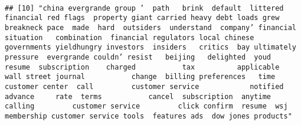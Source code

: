 \documentclass[
]{article}
\begin{document}
\begin{verbatim}
                                                                                                                                                                                                                                                                                                                                                                                                                                                                   
## [10] "china evergrande group ’  path   brink  default  littered  financial red flags  property giant carried heavy debt loads grew  breakneck pace  made  hard  outsiders  understand  company’ financial situation   combination  financial regulators local chinese governments yieldhungry investors  insiders   critics  bay ultimately   pressure  evergrande couldn’ resist   beijing   delighted  youd   resume  subscription    charged           tax          applicable   wall street journal           change  billing preferences   time   customer center  call         customer service            notified  advance     rate  terms           cancel  subscription  anytime  calling         customer service         click confirm  resume  wsj membership customer service tools  features ads  dow jones products"                                                                                                                                                                                                                                                                                                                                                                                                                                                                                                                                                                                                                                                                                                                                                                                                                                                                                                                                                                                                                                                                                                                                                                                                                                                                                                                                                                                                                                                                                                                                                                                                                                                                                                                                                                                                                                                                                                                                                                                                                                                                                                                                            
\end{verbatim}
\end{document}
